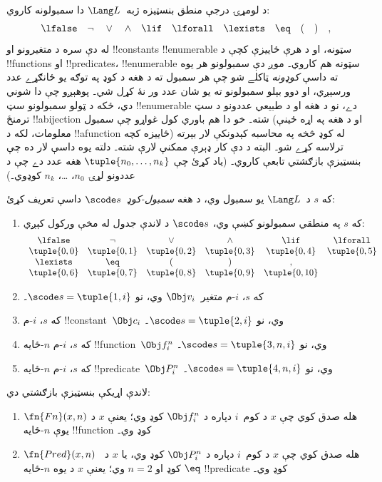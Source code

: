 \documentclass[../../../include/open-logic-section]{subfiles}
\begin{document}

د لومړۍ درجې منطق بنسټيزه ژبه~$\Lang L$ دا سمبولونه کاروي:
\[
\lfalse \quad \lnot \quad \lor \quad \land \quad \lif \quad \lforall
\quad \lexists \quad \eq \quad ( \quad ) \quad ,
\]
له دې سره د متغيرونو او !!{constant}s !!{enumerable} سټونه، او د هرې
ځاييزې کچې د !!{function}s او !!{predicate}s، !!{enumerable} سټونه هم
کاروي۔ موږ
دې سمبولونو هر يوه ته داسې \emph{کوډونه} ټاکلے شو چې هر سمبول ته د
هغه د کوډ په توګه يو ځانګړے عدد ورسېږي، او دوو بېلو سمبولونو ته يو
شان عدد ور نۀ کړل شي۔ پوهېږو چې دا شوني دي، ځکه د ټولو سمبولونو سټ
!!{enumerable} دے، نو د هغه او د طبيعي عددونو د سټ ترمنځ
!!a{bijection} شته۔ خو دا هم باوري کول غواړو چې سمبول (او د هغه په
اړه ځينې معلومات، لکه د !!a{function} ځاييزه کچه) له کوډ څخه په
محاسبه کېدونکې لار بېرته ترلاسه کړے شو۔ البته د دې کار ډېرې ممکنې
لارې شته۔ دلته يوه داسې لار ده چې بنسټيزې بازګشتي تابعې کاروي۔
(ياد کړئ چې $\tuple{n_0, \dots, n_k}$ هغه عدد دے چې د عددونو لړۍ
$n_0$، \dots، $n_k$ کوډوي۔)

\begin{defn}
که $s$ د~$\Lang L$ يو سمبول وي، د هغه \emph{سمبول-کوډ}~$\scode s$
داسې تعريف کړئ:
\begin{enumerate}
\item که $s$ په منطقي سمبولونو کښې وي، $\scode s$ د لاندې جدول له
  مخې ورکول کېږي:
\[
\begin{array}{cccccccccc}
  \lfalse & \lnot & \lor & \land & \lif & \lforall \\
\tuple{0, 0} & \tuple{0, 1} & \tuple{0, 2} & \tuple{0, 3} &
\tuple{0, 4} & \tuple{0, 5} \\
\lexists & \eq & ( & ) & ,\\
\tuple{0, 6} & \tuple{0, 7} &
\tuple{0, 8} & \tuple{0, 9} & \tuple{0, 10}
\end{array}
\]
\item که $s$، $i$-م متغير~$\Obj v_i$ وي، نو
  $\scode s = \tuple{1, i}$۔
\item که $s$، $i$-م !!{constant}~$\Obj c_i$ وي، نو
  $\scode s = \tuple{2, i}$۔
\item که $s$، $i$-م $n$-ځايه !!{function}~$\Obj f_i^n$ وي، نو
  $\scode s = \tuple{3, n, i}$۔
\item که $s$، $i$-م $n$-ځايه !!{predicate}~$\Obj P_i^n$ وي، نو
  $\scode s = \tuple{4, n, i}$۔
\end{enumerate}
\end{defn}

\begin{prop}
لاندې اړيکې بنسټيزې بازګشتي دي:
\begin{enumerate}
\item $\fn{Fn}(x, n)$ هله صدق کوي چې $x$ د کوم~$i$ دپاره د
  $\Obj f^n_i$ کوډ وي؛ يعنې $x$ د يوې $n$-ځايه !!{function} کوډ وي۔
\item $\fn{Pred}(x, n)$ هله صدق کوي چې $x$ د کوم~$i$ دپاره د
  $\Obj P^n_i$ کوډ وي، يا $x$ د~$\eq$ کوډ او $n = 2$ وي؛ يعنې $x$
  د يوه $n$-ځايه !!{predicate} کوډ وي۔
\end{enumerate}
\end{prop}
\end{document}
